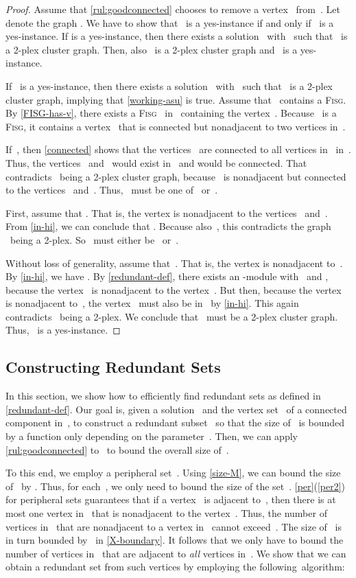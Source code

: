 \documentclass[12pt, a4paper, abstracton]{scrreprt}
\newcommand{\md}[1]{\mbox{-module}}
\newcommand{\FISG}{\textsc{Fisg}}
\theoremstyle{definition}
\theoremstyle{remark}
\begin{document}
\begin{proof}
  Assume that \autoref{rul:goodconnected} chooses to remove a vertex~ from~. Let  denote the graph . We have to show that~ is a yes-instance if and only if~ is a yes-instance. If  is a yes-instance, then there exists a solution~ with~ such that ~is a 2-plex cluster graph. Then, also ~is a 2-plex cluster graph and ~is a yes-instance.

  If ~is a yes-instance, then there exists a solution~ with~ such that ~is a 2-plex cluster graph, implying that \autoref{working-asu} is true. Assume that ~contains a \FISG{}. By \autoref{FISG-has-v}, there exists a \FISG{}~ in~ containing the vertex~.  Because~ is a \FISG{}, it contains a vertex~ that is connected but nonadjacent to two vertices  in~.

  If~, then \autoref{connected} shows that the vertices~ are connected to all vertices in~ in~. Thus, the vertices~ and~ would exist in~ and would be connected. That contradicts ~being a 2-plex cluster graph, because~ is nonadjacent but connected to the vertices~ and~. Thus, ~must be one of~ or~.

  First, assume that . That is, the vertex  is nonadjacent to the vertices~ and~. From \autoref{in-hi}, we can conclude that . Because also~, this contradicts the graph ~being a 2-plex. So~ must either be~ or~.

  Without loss of generality, assume that~. That is, the vertex  is nonadjacent to~. By \autoref{in-hi}, we have . By \autoref{redundant-def}, there exists an \md X  with~ and , because the vertex~ is nonadjacent to the vertex~. But then, because the vertex~ is nonadjacent to~, the vertex ~must also be in~ by \autoref{in-hi}. This again contradicts~ being a 2-plex. We conclude that ~must be a 2-plex cluster graph. Thus, ~is a yes-instance.
\end{proof}

\subsection{Constructing Redundant Sets}
\label{ddot-mu}
In this section, we show how to efficiently find redundant sets as defined in \autoref{redundant-def}. Our goal is, given a solution~ and the vertex set~ of a connected component in~, to construct a redundant subset~ so that the size of~ is bounded by a function only depending on the parameter~. Then, we can apply \autoref{rul:goodconnected} to~ to bound the overall size of~.

To this end, we employ a peripheral set~. Using \autoref{size-M}, we can bound the size of~ by . Thus, for each~, we only need to bound the size of the set~. \autoref{per}(\ref{per2}) for peripheral sets guarantees that if a vertex~ is adjacent to~, then there is at most one vertex in~ that is nonadjacent to the vertex~. Thus, the number of vertices in~ that are nonadjacent to a vertex in~ cannot exceed~. The size of~ is in turn bounded by~ in \autoref{X-boundary}. It follows that we only have to bound the number of vertices in~ that are adjacent to \emph{all} vertices in~. We show that we can obtain a redundant set from such vertices by employing the following~algorithm:
\end{document}
